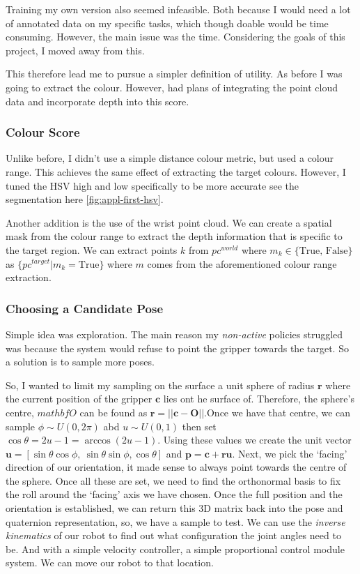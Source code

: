 Training my own version also seemed infeasible. Both because I would need a lot of annotated data on my specific tasks, which though doable would be time consuming. However, the main issue was the time. Considering the goals of this project, I moved away from this.

This therefore lead me to pursue a simpler definition of utility. As before  I was going to extract the colour. However, had plans of integrating the point cloud data and incorporate depth into this score.

\subsubsection{Colour Score}
Unlike before, I didn't use a simple distance colour metric, but used a colour range. This achieves the same effect of extracting the target colours. However, I tuned the HSV high and low specifically to be more accurate see the segmentation here \ref{fig:appl-first-hsv}.

Another addition is the use of the wrist point cloud. We can create a spatial mask from the colour range to extract the depth information that is specific to the target region. We can extract points $k$ from \( {pc}^{world}\) where \(m_k \in \{ \text{True, False} \}\) as \( \{ {pc}^{target} | m_k = \text{True} \} \) where $m$ comes from the aforementioned colour range extraction.

\subsubsection{Choosing a Candidate Pose}\label{sec:appl-first-choose-pose}
Simple idea was exploration. The main reason my \emph{non-active} policies struggled was because the system would refuse to point the gripper towards the target. So a solution is to sample more poses.

So, I wanted to limit my sampling on the surface a unit sphere of radius $\mathbf{r}$ where the current position of the gripper $\mathbf{c}$ lies ont he surface of. Therefore, the sphere's centre, $mathbf{O}$ can be found as \(\mathbf{r} = || \mathbf{c} - \mathbf{O} || \).Once we have that centre, we can sample \(\phi \sim U\left(0, 2\pi\right)\) abd \(u\sim U\left(0, 1\right)\) then set \(\cos \theta = 2u - 1 = \arccos\left(2u - 1\right)\). Using these values we create the unit vector \(\mathbf{u} = \left[ \sin\theta\cos\phi, ~\sin\theta\sin\phi, \cos\theta\right]\) and \(\mathbf{p} = \mathbf{c} + \mathbf{ru}\). Next, we pick the `facing' direction of our orientation, it made sense to always point towards the centre of the sphere. Once all these are set, we need to find the orthonormal basis to fix the roll around the  `facing' axis we have chosen. Once the full position and the orientation is established, we can return this 3D matrix back into the pose and quaternion representation, so, we have a sample to test. We can use the \emph{inverse kinematics} of our robot to find out what configuration the joint angles need to be. And with a simple velocity controller, a simple proportional control module system. We can move our robot to that location.

